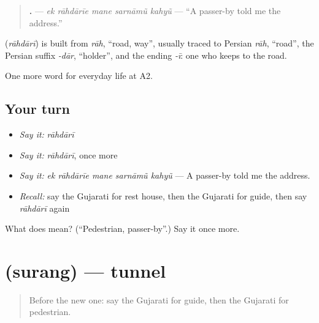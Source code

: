 \begin{quote}
\textbf{    .} — \emph{ek rāhdārīe mane sarnāmũ kahyũ} — \textquotedblleft{}A passer-by told me the address.\textquotedblright{}
\end{quote}

\begin{cousinweb}
\textbf{} (\emph{rāhdārī}) is built from \emph{rāh}, \textquotedblleft{}road, way\textquotedblright{}, usually traced to Persian \emph{rāh}, \textquotedblleft{}road\textquotedblright{}, the Persian suffix \emph{-dār}, \textquotedblleft{}holder\textquotedblright{}, and the ending \emph{-ī}: one who keeps to the road.
\end{cousinweb}

\begin{grammarlens}[title={What you've built}]
One more word for everyday life at A2.
\end{grammarlens}

\subsection*{Your turn}
\begin{itemize}
\raggedright
  \item \emph{Say it:} \emph{rāhdārī}
  \item \emph{Say it:} \emph{rāhdārī}, once more
  \item \emph{Say it:} \emph{ek rāhdārīe mane sarnāmũ kahyũ} — A passer-by told me the address.
  \item \emph{Recall:} say the Gujarati for rest house, then the Gujarati for guide, then say \emph{rāhdārī} again
\end{itemize}

\begin{tcolorbox}[breakable,colback=teal!4,colframe=teal!35!black,title={Before you move on}]
What does  mean? (\textquotedblleft{}Pedestrian, passer-by\textquotedblright{}.) Say it once more.
\end{tcolorbox}
\section[\texorpdfstring{\gu{સુરંગ} (surang)}{સુરંગ (surang)}]{ (surang) — tunnel}

\label{lesson:GU-C212-surang}



\begin{quote}
Before the new one: say the Gujarati for guide, then the Gujarati for pedestrian.
\end{quote}

